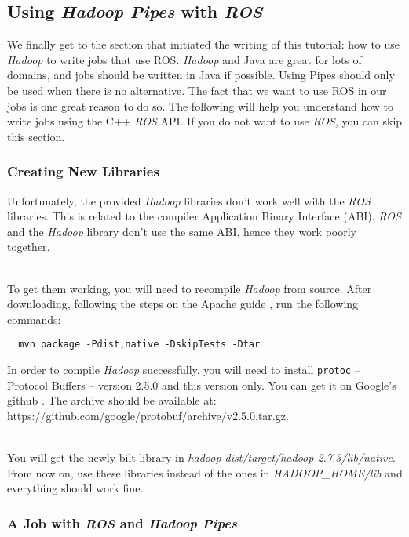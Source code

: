 \documentclass[a4paper, 12pt]{article}
\begin{document}
  \subsection{Using \textit{Hadoop Pipes} with \textit{ROS}}

We finally get to the section that initiated the writing of this tutorial: how to use \textit{Hadoop} to write jobs that use ROS. \textit{Hadoop} and Java are great for lots of domains, and jobs should be written in Java if possible. Using Pipes should only be used when there is no alternative. The fact that we want to use ROS in our jobs is one great reason to do so. The following will help you understand how to write jobs using the C++ \textit{ROS} API. If you do not want to use \textit{ROS}, you can skip this section.

    \subsubsection{Creating New Libraries}

Unfortunately, the provided \textit{Hadoop} libraries don't work well with the \textit{ROS} libraries. This is related to the compiler Application Binary Interface (ABI). \textit{ROS} and the \textit{Hadoop} library don't use the same ABI, hence they work poorly together. 

~\\
To get them working, you will need to recompile \textit{Hadoop} from source. After downloading, following the steps on the Apache guide \cite{native_libs}, run the following commands:

\begin{verbatim}
  mvn package -Pdist,native -DskipTests -Dtar
\end{verbatim}

In order to compile \textit{Hadoop} successfully, you will need to install \texttt{protoc} -- Protocol Buffers -- version 2.5.0 and this version only. You can get it on Google's github \cite{google_github}. The archive should be available at: https://github.com/google/protobuf/archive/v2.5.0.tar.gz.

~\\
You will get the newly-bilt library in \textit{hadoop-dist/target/hadoop-2.7.3/lib/native}. From now on, use these libraries instead of the ones in \textit{HADOOP\_HOME/lib} and everything should work fine.

    \subsubsection{A Job with \textit{ROS} and \textit{Hadoop Pipes}}
  
\end{document}
